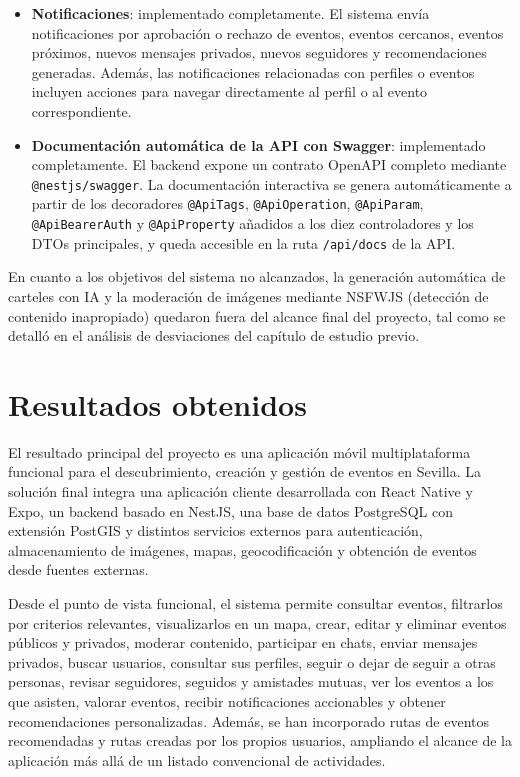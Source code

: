 \begin{itemize}
    \item \textbf{Notificaciones}: implementado completamente. El sistema envía notificaciones por aprobación o rechazo de eventos, eventos cercanos, eventos próximos, nuevos mensajes privados, nuevos seguidores y recomendaciones generadas. Además, las notificaciones relacionadas con perfiles o eventos incluyen acciones para navegar directamente al perfil o al evento correspondiente.

    \item \textbf{Documentación automática de la API con Swagger}: implementado completamente. El backend expone un contrato OpenAPI completo mediante \texttt{@nestjs/swagger}. La documentación interactiva se genera automáticamente a partir de los decoradores \texttt{@ApiTags}, \texttt{@ApiOperation}, \texttt{@ApiParam}, \texttt{@ApiBearerAuth} y \texttt{@ApiProperty} añadidos a los diez controladores y los DTOs principales, y queda accesible en la ruta \texttt{/api/docs} de la API.
\end{itemize}

En cuanto a los objetivos del sistema no alcanzados, la generación automática de carteles con IA y la moderación de imágenes mediante NSFWJS (detección de contenido inapropiado) quedaron fuera del alcance final del proyecto, tal como se detalló en el análisis de desviaciones del capítulo de estudio previo.

\section{Resultados obtenidos}

El resultado principal del proyecto es una aplicación móvil multiplataforma funcional para el descubrimiento, creación y gestión de eventos en Sevilla. La solución final integra una aplicación cliente desarrollada con React Native y Expo, un backend basado en NestJS, una base de datos PostgreSQL con extensión PostGIS y distintos servicios externos para autenticación, almacenamiento de imágenes, mapas, geocodificación y obtención de eventos desde fuentes externas.

Desde el punto de vista funcional, el sistema permite consultar eventos, filtrarlos por criterios relevantes, visualizarlos en un mapa, crear, editar y eliminar eventos públicos y privados, moderar contenido, participar en chats, enviar mensajes privados, buscar usuarios, consultar sus perfiles, seguir o dejar de seguir a otras personas, revisar seguidores, seguidos y amistades mutuas, ver los eventos a los que asisten, valorar eventos, recibir notificaciones accionables y obtener recomendaciones personalizadas. Además, se han incorporado rutas de eventos recomendadas y rutas creadas por los propios usuarios, ampliando el alcance de la aplicación más allá de un listado convencional de actividades.

